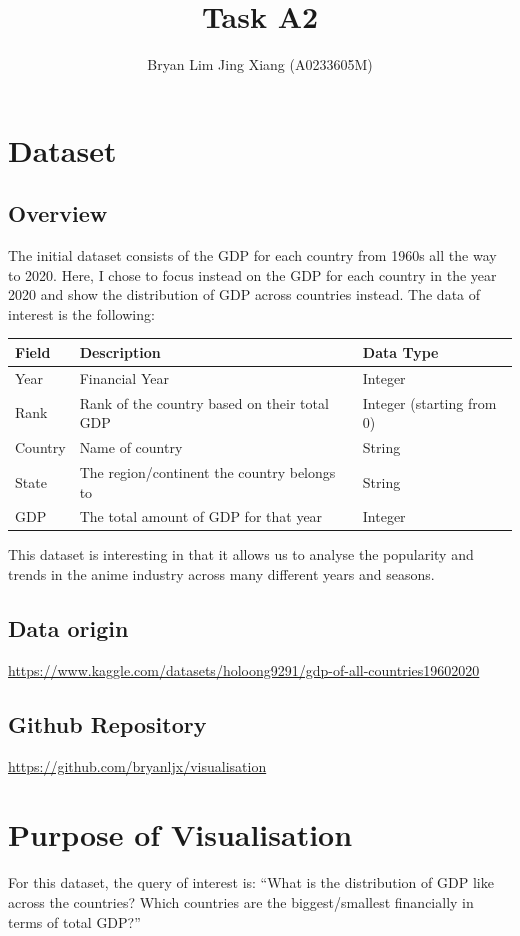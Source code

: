 \documentclass[a4paper, 11pt]{article}
\author{Bryan Lim Jing Xiang (A0233605M)}
\date{}
\title{Task A2}
\begin{document}
\maketitle
\section{Dataset}
\label{sec:orgd562c14}
\subsection{Overview}
\label{sec:org49280d2}
The initial dataset consists of the GDP for each country from 1960s all the way to 2020. Here, I chose to focus instead on the GDP for each country in the year 2020 and show the distribution of GDP across countries instead. The data of interest is the following:

\begin{center}
\begin{tabular}{lll}
Field & Description & Data Type\\[0pt]
\hline
Year & Financial Year & Integer\\[0pt]
Rank & Rank of the country based on their total GDP & Integer (starting from 0)\\[0pt]
Country & Name of country & String\\[0pt]
State & The region/continent the country belongs to & String\\[0pt]
GDP & The total amount of GDP for that year & Integer\\[0pt]
\end{tabular}
\end{center}

This dataset is interesting in that it allows us to analyse the popularity and trends in the anime industry across many different years and seasons.
\subsection{Data origin}
\label{sec:org4be07b7}
\url{https://www.kaggle.com/datasets/holoong9291/gdp-of-all-countries19602020}
\subsection{Github Repository}
\label{sec:org17cffc9}
\url{https://github.com/bryanljx/visualisation}
\section{Purpose of Visualisation}
\label{sec:orgbdcf48d}
For this dataset, the query of interest is: ``What is the distribution of GDP like across the countries? Which countries are the biggest/smallest financially in terms of total GDP?''
\end{document}
